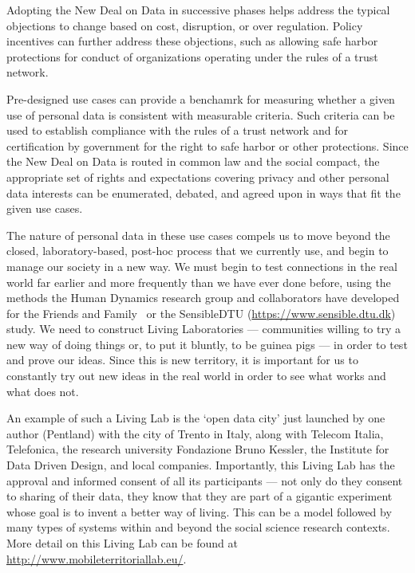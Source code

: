 Adopting the New Deal on Data in successive phases helps address the typical objections to change based on cost, disruption, or over regulation.
Policy incentives can further address these objections, such as allowing safe harbor protections
for conduct of organizations operating under the rules of a trust network.  

Pre-designed use cases can provide a benchamrk for measuring whether a given use of personal data is consistent with measurable criteria.
Such criteria can be used to establish compliance with the rules of a trust network and 
for certification by government for the right to safe harbor or other protections.
Since the New Deal on Data is routed in common law and the social compact, 
the appropriate set of rights and expectations covering privacy and other personal data interests can be  enumerated, debated, and agreed upon in ways that fit the given use cases.  

The nature of personal data in these use cases compels us to move beyond the closed, laboratory-based, post-hoc process that we currently use, and begin to manage our society in a new way.
We must begin to test connections in the real world far earlier and more frequently than we have ever done before, 
using the methods the Human Dynamics research group and collaborators have developed for the Friends and Family~\cite{aharony2011social} or the SensibleDTU (\url{https://www.sensible.dtu.dk}) study. 
We need to construct Living Laboratories ---
communities willing to try a new way of doing things or, to put it bluntly, to be guinea pigs --- 
in order to test and prove our ideas.
Since this is new territory, it is important for us to constantly try out 
new ideas in the real world in order to see what works and what does not.

An example of such a Living Lab is the `open data city' just launched 
by one author (Pentland) with the city of Trento in Italy, along with 
Telecom Italia, Telefonica, the research university Fondazione Bruno Kessler, 
the Institute for Data Driven Design, and local companies.
Importantly, this Living Lab has the approval and informed consent of all its participants --- not only do they consent to sharing of their data, they know that they are part of a gigantic experiment whose 
goal is to invent a better way of living.  
This can be a model followed by many types of systems 
within and beyond the social science research contexts.  
More detail on this Living Lab can be found at \url{http://www.mobileterritoriallab.eu/}.




